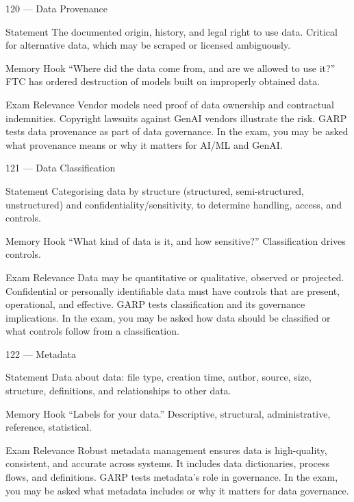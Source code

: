 \documentclass[aspectratio=169,8pt]{beamer}
\begin{document}
	\begin{frame}{120 --- Data Provenance}
		\begin{block}{Statement}
			The documented origin, history, and legal right to use data. Critical for alternative data, which may be scraped or licensed ambiguously.
		\end{block}
		\begin{block}{Memory Hook}
			``Where did the data come from, and are we allowed to use it?'' FTC has ordered destruction of models built on improperly obtained data.
		\end{block}
		\begin{block}{Exam Relevance}
			Vendor models need proof of data ownership and contractual indemnities. Copyright lawsuits against GenAI vendors illustrate the risk. GARP tests data provenance as part of data governance. In the exam, you may be asked what provenance means or why it matters for AI/ML and GenAI.
		\end{block}
	\end{frame}
	
	\begin{frame}{121 --- Data Classification}
		\begin{block}{Statement}
			Categorising data by structure (structured, semi-structured, unstructured) and confidentiality/sensitivity, to determine handling, access, and controls.
		\end{block}
		\begin{block}{Memory Hook}
			``What kind of data is it, and how sensitive?'' Classification drives controls.
		\end{block}
		\begin{block}{Exam Relevance}
			Data may be quantitative or qualitative, observed or projected. Confidential or personally identifiable data must have controls that are present, operational, and effective. GARP tests classification and its governance implications. In the exam, you may be asked how data should be classified or what controls follow from a classification.
		\end{block}
	\end{frame}
	
	\begin{frame}{122 --- Metadata}
		\begin{block}{Statement}
			Data about data: file type, creation time, author, source, size, structure, definitions, and relationships to other data.
		\end{block}
		\begin{block}{Memory Hook}
			``Labels for your data.'' Descriptive, structural, administrative, reference, statistical.
		\end{block}
		\begin{block}{Exam Relevance}
			Robust metadata management ensures data is high-quality, consistent, and accurate across systems. It includes data dictionaries, process flows, and definitions. GARP tests metadata's role in governance. In the exam, you may be asked what metadata includes or why it matters for data governance.
		\end{block}
	\end{frame}
	
\end{document}
